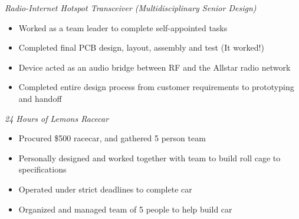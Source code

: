 \documentclass[line,mmmargin]{res}
\begin{document}
\begin{resume}
	{\sl Radio-Internet Hotspot Transceiver (Multidisciplinary Senior Design)}
		\begin{itemize} \itemsep -2pt
			\item Worked as a team leader to complete self-appointed tasks
			\item Completed final PCB design, layout, assembly and test (It worked!)
			\item Device acted as an audio bridge between RF and the Allstar radio network
			\item Completed entire design process from customer requirements to prototyping and handoff
		\end{itemize}
	\vspace{-10pt}
	{\sl 24 Hours of Lemons Racecar}
		\begin{itemize} \itemsep -2pt
			\item Procured \$500 racecar, and gathered 5 person team
			\item Personally designed and worked together with team to build roll cage to specifications
			\item Operated under strict deadlines to complete car
			\item Organized and managed team of 5 people to help build car
		\end{itemize}
	\vspace{-10pt}


\end{resume}
\end{document}
